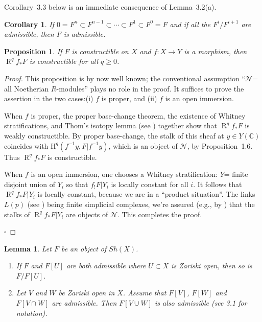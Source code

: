 \documentclass[10pt,twoside]{article}
\newtheorem{prop}[thm]{Proposition}
\newtheorem{lem}[thm]{Lemma}
\newtheorem{cor}[thm]{Corollary}
\newcommand{\homology}{{\mathrm {H}}}
\newcommand{\C}{{\mathbb {C}}}
\newcommand{\derived}{{\operatorname{R}}}
\newcommand{\qed}{\nopagebreak\par\hspace*{\fill}$\square$\par\vskip2mm}
\newtheorem{proof}{Proof}
\begin{document}
Corollary~3.3 below is an immediate consequence of Lemma~3.2(a).

\renewcommand{\thethm}{3.3}
\begin{cor} If $0=F^n\subset F^{n-1} \subset \cdots \subset
F^1 \subset F^0=F$ and if all the $F^i/F^{i+1}$ are admissible,
then $F$ is admissible.
\end{cor}

\renewcommand{\thethm}{3.4}

\begin{prop} If $F$ is constructible
 on $X$ and $f:X \to Y$ is a morphism, then $\derived^qf_*F$ 
is constructible for all $q \geq 0$.
\end{prop}

\begin{proof} This proposition is by now well known; the 
conventional assumption ``$\mathcal{N}$= 
all Noetherian $R$-modules'' plays no role in the proof.
It suffices to prove the assertion 
in the two cases:(i) $f$ is proper, and (ii) $f$ is an open
immersion. 

When $f$ is proper, the proper base-change theorem, the
 existence of Whitney stratifications, and Thom's
isotopy lemma (see \cite[page~41]{nori:GM}) together show that 
 $\derived^qf_*F$ is weakly constructible. By proper base-change,
the stalk of this sheaf at $y \in Y(\C)$ coincides with
$\homology^q(f^{-1}y, F|f^{-1}y)$, which is an object of 
$\mathcal{N}$, by Proposition~1.6. Thus 
  $\derived^qf_*F$ is constructible.

When $f$ is an open immersion, one chooses a Whitney  
stratification: $Y$= finite disjoint union of $Y_i$ so
that $f_!F|Y_i$ is locally constant for all $i$. It follows
that
$\derived^qf_*F|Y_i$ is locally constant, because we 
are in a ``product situation''. The links $L(p)$ (see \cite[page~41]{nori:GM})
being finite simplicial complexes, we're assured (e.g., by 
\cite[Prop.~8.1.4(ii)]{nori:KS}) that the stalks of  $\derived^qf_*F|Y_i$ 
are objects of $\mathcal{N}$. This completes the proof.
\qed\end{proof}

\renewcommand{\thethm}{3.5}
\begin{lem}Let $F$ be an object of $Sh(X)$. 
\begin{enumerate}
\item[{\rm (a)}] If $F$ and $F[U]$ are
both admissible where $U \subset X$ is Zariski
 open, then so is $F/F[U]$. 
\item[{\rm (b)}] Let $V$ and $W$ be Zariski
open in $X$. Assume that $F[V]$, $F[W]$ and $F[V \cap W]$
are admissible. Then $F[V \cup W]$ is also admissible (see 3.1 for notation).
\end{enumerate}
\end{lem}
\end{document}
